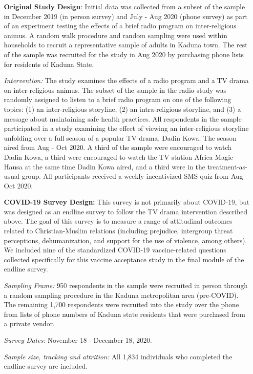 \documentclass[
  12pt,
]{article}
\begin{document}
\textbf{Original Study Design}: Initial data was collected from a subset of the sample in December 2019 (in person survey) and July - Aug 2020 (phone survey) as part of an experiment testing the effects of a brief radio program on inter-religious animus. A random walk procedure and random sampling were used within households to recruit a representative sample of adults in Kaduna town. The rest of the sample was recruited for the study in Aug 2020 by purchasing phone lists for residents of Kaduna State.

\emph{Intervention:} The study examines the effects of a radio program and a TV drama on inter-religious animus. The subset of the sample in the radio study was randomly assigned to listen to a brief radio program on one of the following topics: (1) an inter-religious storyline, (2) an intra-religious storyline, and (3) a message about maintaining safe health practices. All respondents in the sample participated in a study examining the effect of viewing an inter-religious storyline unfolding over a full season of a popular TV drama, Dadin Kowa. The season aired from Aug - Oct 2020. A third of the sample were encouraged to watch Dadin Kowa, a third were encouraged to watch the TV station Africa Magic Hausa at the same time Dadin Kowa aired, and a third were in the treatment-as-usual group. All participants received a weekly incentivized SMS quiz from Aug - Oct 2020.

\textbf{COVID-19 Survey Design:} This survey is not primarily about COVID-19, but was designed as an endline survey to follow the TV drama intervention described above. The goal of this survey is to measure a range of attitudinal outcomes related to Christian-Muslim relations (including prejudice, intergroup threat perceptions, dehumanization, and support for the use of violence, among others). We included nine of the standardized COVID-19 vaccine-related questions collected specifically for this vaccine acceptance study in the final module of the endline survey.

\emph{Sampling Frame:} 950 respondents in the sample were recruited in person through a random sampling procedure in the Kaduna metropolitan area (pre-COVID). The remaining 1,700 respondents were recruited into the study over the phone from lists of phone numbers of Kaduna state residents that were purchased from a private vendor.

\emph{Survey Dates:} November 18 - December 18, 2020.

\emph{Sample size, tracking and attrition:} All 1,834 individuals who completed the endline survey are included.
\end{document}

